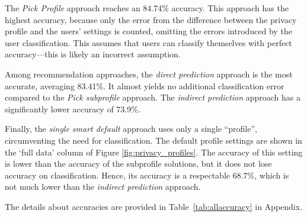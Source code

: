 The \textit{Pick Profile} approach reaches an 84.74\% accuracy. This approach has the highest accuracy, because only the error from the difference between the privacy profile and the users' settings is counted, omitting the errors introduced by the user classification. This assumes that users can classify themselves with perfect accuracy---this is likely an incorrect assumption.

Among recommendation approaches, the \textit{direct prediction} approach is the most accurate, averaging 83.41\%. It almost yields no additional classification error compared to the \textit{Pick subprofile} approach. 
The \textit{indirect prediction} approach has a significantly lower accuracy of 73.9\%.


Finally, the \textit{single smart default} approach uses only a single ``profile'', circumventing the need for classification. The default profile settings are shown in the `full data' column of Figure \ref{fig:privacy_profiles}. The accuracy of this setting is lower than the accuracy of the subprofile solutions, but it does not lose accuracy on classification. Hence, its accuracy is a respectable 68.7\%, which is not much lower than the \textit{indirect prediction} approach. 

The details about accuracies are provided in Table~\ref{tab:allaccuracy} in Appendix.







